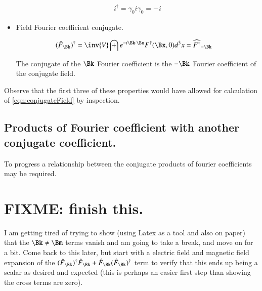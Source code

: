 \documentclass{article}
\begin{document}
\begin{itemize}
\begin{align}
i^\dagger = \gamma_{0} i \gamma_0 = -i
\end{align}

\item Field Fourier coefficient conjugate.

\begin{align}
(\hat{F}_{\Bk})^\dagger 
&=
\inv{V} \int e^{-i \Bk \cdot \Bx } F^\dagger(\Bx,0) d^3x = \widehat{F^\dagger}_{-\Bk}
\end{align}

The conjugate of the $\Bk$ Fourier coefficient is the $-\Bk$ Fourier coefficient of the conjugate field.

\end{itemize}

Observe that the first three of these properties would have allowed for calculation of 
\ref{eqn:conjugateField} by inspection.

\subsection{ Products of Fourier coefficient with another conjugate coefficient. }

To progress a relationship between the conjugate products of fourier coefficients may be required.

\section{ FIXME: finish this. }

I am getting tired of trying to show (using Latex as a tool and also on paper)
that the $\Bk \ne \Bm$ terms vanish and am going to take a break, and move on for a bit.  Come back to this later, but start
with a electric field and magnetic field expansion of the $
(\hat{F}_\Bk)^\dagger \hat{F}_\Bk
+
\hat{F}_\Bk (\hat{F}_\Bk)^\dagger 
$ term to verify that this ends up being a scalar as desired and expected
(this is perhaps an easier first step than showing the cross terms are zero).



\end{document}
